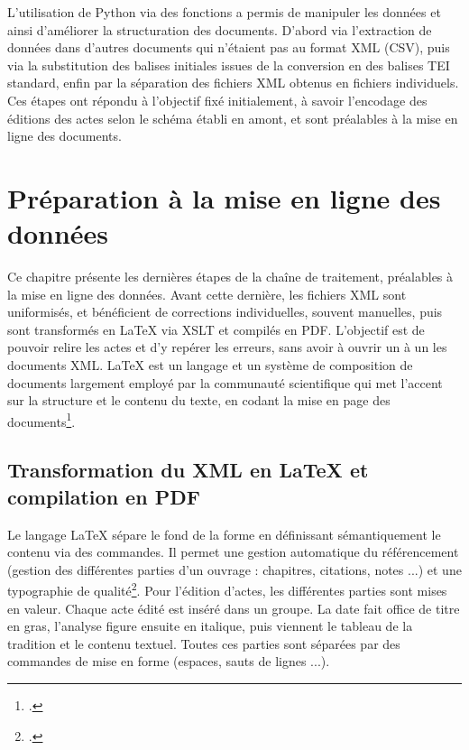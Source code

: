 \par L'utilisation de Python via des fonctions a permis de manipuler les données et ainsi d'améliorer la structuration des documents. D'abord via l'extraction de données dans d'autres documents qui n'étaient pas au format XML (CSV), puis via la substitution des balises initiales issues de la conversion en des balises TEI standard, enfin par la séparation des fichiers XML obtenus en fichiers individuels. Ces étapes ont répondu à l'objectif fixé initialement, à savoir l'encodage des éditions des actes selon le schéma établi en amont, et sont préalables à la mise en ligne des documents. 

\newpage
\thispagestyle{empty}
\mbox{}
\newpage

\chapter{Préparation à la mise en ligne des données}

\par Ce chapitre présente les dernières étapes de la chaîne de traitement, préalables à la mise en ligne des données. Avant cette dernière, les fichiers XML sont uniformisés, et bénéficient de corrections individuelles, souvent manuelles, puis sont transformés en LaTeX via XSLT et compilés en PDF. L'objectif est de pouvoir relire les actes et d'y repérer les erreurs, sans avoir à ouvrir un à un les documents XML. LaTeX est un langage et un système de composition de documents largement employé par la communauté scientifique qui met l'accent sur la structure et le contenu du texte, en codant la mise en page des documents\footnote{\cite{LaTeXDMS}.}. 
\newpage 

\section[Transformation et compilation des fichiers]{Transformation du XML en LaTeX et compilation en PDF}
\label{III.6.1}

\par Le langage LaTeX sépare le fond de la forme en définissant sémantiquement le contenu via des commandes. Il permet une gestion automatique du référencement (gestion des différentes parties d'un ouvrage : chapitres, citations, notes ...) et une typographie de qualité\footnote{\cite{LaTeXDMS}.}. Pour l'édition d'actes, les différentes parties sont mises en valeur. Chaque acte édité est inséré dans un groupe. La date fait office de titre en gras, l'analyse figure ensuite en italique, puis viennent le tableau de la tradition et le contenu textuel. Toutes ces parties sont séparées par des commandes de mise en forme (espaces, sauts de lignes ...). 
\newline 

